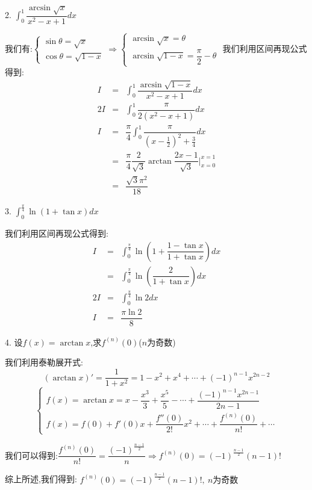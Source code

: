 2. $\int_{0}^{1}\dfrac{\arcsin\sqrt{x}}{x^2-x+1}dx$
\begin{solution}

	我们有:$\left\lbrace
	\begin{array}{l}
		\sin\theta=\sqrt{x}\\
		\cos\theta=\sqrt{1-x}
	\end{array}
	\right. \Rightarrow \left\lbrace
	\begin{array}{l}
		\arcsin\sqrt{x}=\theta\\
		\arcsin\sqrt{1-x}=\dfrac{\pi}{2}-\theta
	\end{array}
	\right. $
	我们利用区间再现公式得到:  
	\begin{eqnarray*}
		I&=&\int_{0}^{1}\dfrac{\arcsin\sqrt{1-x}}{x^2-x+1}dx\\
		2I&=&\int_{0}^{1}\dfrac{\pi}{2(x^2-x+1)}dx\\
		I&=&\dfrac{\pi}{4}\int_{0}^{1}\dfrac{\pi}{(x-\frac{1}{2})^2+\frac{3}{4}}dx\\
		&=&\dfrac{\pi}{4}\dfrac{2}{\sqrt{3}}\arctan\dfrac{2x-1}{\sqrt{3}}|_{x=0}^{x=1}\\
		&=&\dfrac{\sqrt{3}\pi^2}{18}
	\end{eqnarray*}
\end{solution}

3. $\int_{0}^{\frac{\pi}{4}}\ln(1+\tan x)dx$
\begin{solution}

	我们利用区间再现公式得到:
	\begin{eqnarray*}
		I&=&\int_{0}^{\frac{\pi}{4}}\ln(1+\dfrac{1-\tan x}{1+\tan x})dx\\
		&=&\int_{0}^{\frac{\pi}{4}}\ln(\dfrac{2}{1+\tan x})dx\\
		2I&=&\int_{0}^{\frac{\pi}{4}}\ln2dx\\
		I&=&\dfrac{\pi \ln2}{8}
	\end{eqnarray*}
\end{solution}

4. 设$f(x)=\arctan x$,求$f^{(n)}(0)$($n$为奇数)
\begin{solution}

	我们利用泰勒展开式:
	$$(\arctan x)'=\dfrac{1}{1+x^2}=1-x^2+x^4+\cdots+(-1)^{n-1}x^{2n-2}$$
	$$\left\lbrace
	\begin{array}{l}
		f(x)=\arctan x=x-\dfrac{x^3}{3}+\dfrac{x^5}{5}-\cdots+\dfrac{(-1)^{n-1}x^{2n-1}}{2n-1}\\
		f(x)=f(0)+f'(0)x+\dfrac{f''(0)}{2!}x^2+\cdots+\dfrac{f^{(n)}(0)}{n!}+\cdots
	\end{array}
	\right. $$
	
	我们可以得到:$\dfrac{f^{(n)}(0)}{n!}=\dfrac{(-1)^{\frac{n-1}{2}}}{n}\Rightarrow f^{(n)}(0)=(-1)^{\frac{n-1}{2}}(n-1)!$
		
	综上所述,我们得到:  $f^{(n)}(0)=(-1)^{\frac{n-1}{2}}(n-1)!,\ n\text{为奇数}$
\end{solution}


